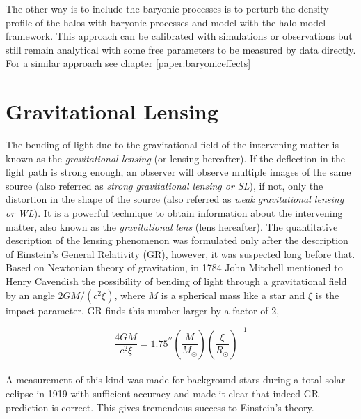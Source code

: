 The other way is to include the baryonic processes is to perturb the density profile 
of the halos with baryonic processes and model with the halo model framework. This approach can 
be calibrated with simulations or observations but still remain analytical with some 
free parameters to be measured by data directly. 
For a similar approach see chapter \ref{paper:baryoniceffects}



\clearpage
\section{Gravitational Lensing}
The bending of light due to the gravitational field of the intervening matter is known as
the {\it gravitational lensing} (or lensing hereafter). If the deflection in the light
path is strong enough, an observer will observe multiple images of the same source 
(also referred as {\it strong gravitational lensing or SL}), 
if not, only the distortion in the shape of the source  
(also referred as {\it weak gravitational lensing or WL}). It is a powerful technique to 
obtain information about the intervening matter, also known as the {\it gravitational
lens} (lens hereafter). The quantitative description of the lensing phenomenon
was formulated only after the description of Einstein's General Relativity (GR), however,
it was suspected long before that. Based on Newtonian theory of gravitation, in 1784 
John Mitchell mentioned to Henry Cavendish the possibility of bending of light
through a gravitational field by an angle $ 2GM/(c^2 \xi)$, where $M$ is a spherical
mass like a star and $\xi$ is the impact parameter. GR finds this number larger 
by a factor of 2,

\begin{equation}
	\dfrac{4GM}{c^2 \xi} = 1.75^{\prime \prime} 
					\left(\dfrac{M}{M_{\odot}}\right)
					\left(\dfrac{\xi}{R_{\odot}} \right)^{-1}
\end{equation}
\\
A measurement of this kind was made for background stars during a total solar eclipse
in 1919 with sufficient accuracy and made it clear that indeed GR prediction is 
correct. This gives tremendous success to Einstein's theory. 

